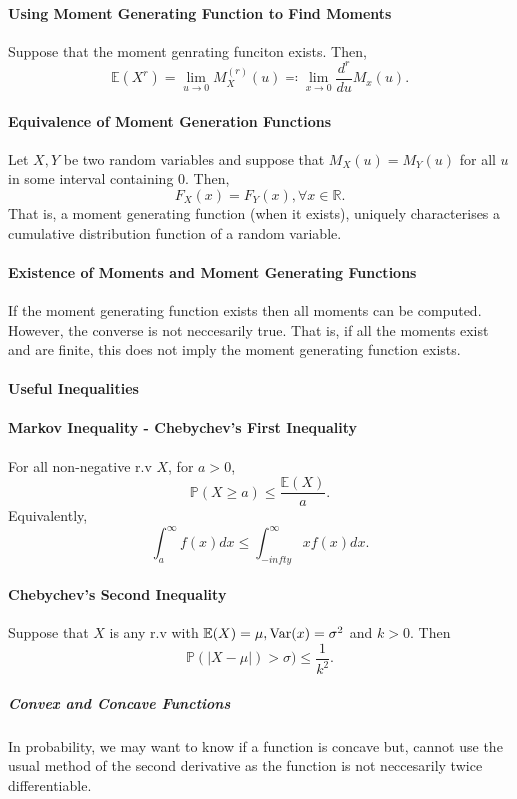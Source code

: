 \paragraph{Using Moment Generating Function to Find Moments}
Suppose that the moment genrating funciton exists. Then,
\[
    \mathbb{E}(X^r)
    = \lim_{u\to 0} M_X^(r)(u)
    \eqqcolon \lim_{x\to 0} \frac{d^r}{d u} M_x(u) .
\]

\paragraph{Equivalence of Moment Generation Functions}
Let \(X, Y\) be two random variables and 
suppose that \(M_X(u) = M_Y(u)\) for all \(u\) in some interval
containing \(0\). Then, \[
    F_X(x) = F_Y(x), \forall x \in \mathbb{R}.
\]
That is, a moment generating function (when it exists), uniquely
characterises a cumulative distribution function of a random variable.

\paragraph{Existence of Moments and Moment Generating Functions}
If the moment generating function exists then all moments can be computed.
However, the converse is not neccesarily true.
That is, if all the moments exist and are finite, this does not imply
the moment generating function exists.

\paragraph{Useful Inequalities}

\paragraph{Markov Inequality - Chebychev's First Inequality}
For all non-negative r.v \(X\), for \(a > 0\),
\[
    \mathbb{P}(X \geq a) \leq \frac{\mathbb{E}(X)}{a}.
\]
Equivalently, \[
    \int_{a}^{\infty} f(x) dx \leq \int_{-infty}^{\infty} x f(x) dx.
\]

\paragraph{Chebychev's Second Inequality}
Suppose that \(X\) is any r.v with \(\mathbb{E}(X) = \mu, \mathrm{Var}(x) = \sigma^2\)
and \(k > 0\). Then \[
    \mathbb{P}(|X - \mu|) > \sigma) \leq \frac{1}{k^2}.
\]

\subparagraph{Convex and Concave Functions}
In probability, we may want to know if a function is concave but,
cannot use the usual method of the second derivative as the
function is not neccesarily twice differentiable.

